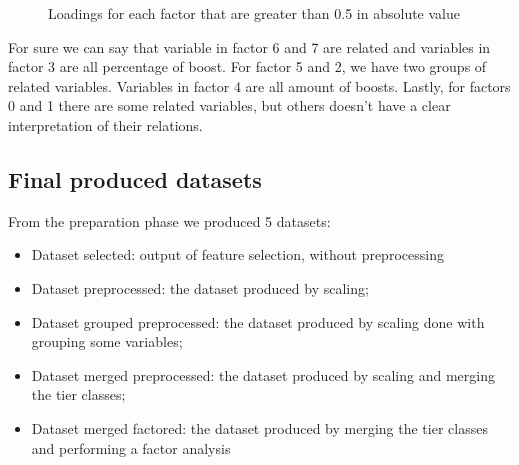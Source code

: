 \begin{figure}[H]
    \label{fig:loadings}
    \caption{Loadings for each factor that are greater than 0.5 in absolute value} 
\end{figure}

For sure we can say that variable in factor 6 and 7 are related and variables in factor 3 are all percentage of boost. For factor 5 and 2, we have two groups of related variables. Variables in factor 4 are all amount of boosts. Lastly, for factors 0 and 1 there are some related variables, but others doesn't have a clear interpretation of their relations.

\subsection{Final produced datasets}

From the preparation phase we produced 5 datasets:

\begin{itemize}
    \item Dataset selected: output of feature selection, without preprocessing
    \item Dataset preprocessed: the dataset produced by scaling;
    \item Dataset grouped preprocessed: the dataset produced by scaling done with grouping some variables;
    \item Dataset merged preprocessed: the dataset produced by scaling and merging the tier classes;
    \item Dataset merged factored: the dataset produced by merging the tier classes and performing a factor analysis
\end{itemize}